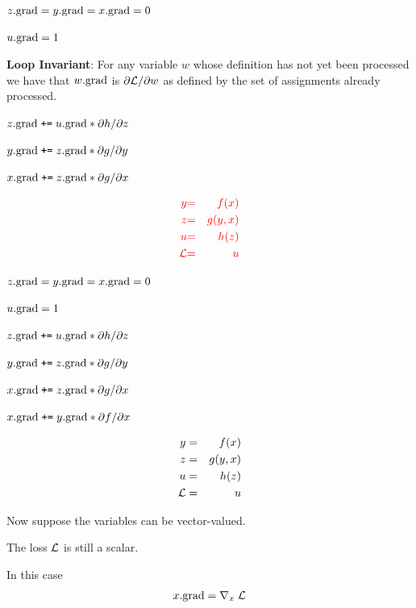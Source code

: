 {\medskip
$z.\mathrm{grad} = y.\mathrm{grad} = x.\mathrm{grad} = 0$

\medskip
$u.\mathrm{grad} = 1$

\medskip
    {\bf Loop Invariant}: For any variable $w$ whose definition has not yet been processed we have that $w.\mathrm{grad}$ is $\partial {\cal L}/\partial w$ as defined by the set of assignments already processed.

\medskip
$z.\mathrm{grad}\;\mbox{\tt +=}\; u.\mathrm{grad} * {\partial h}/{\partial z}$

\medskip
$y.\mathrm{grad} \;\mbox{\tt +=}\; z.\mathrm{grad} * {\partial g}/{\partial y}$

\medskip
$x.\mathrm{grad} \;\mbox{\tt +=}\; z.\mathrm{grad} * {\partial g}/{\partial x}$

\vspace{-3ex}
\begin{eqnarray*}
  {\color{red} y} & {\color{red} =} & {\color{red} f(x)} \\
  {\color{red} z} & {\color{red} =} & {\color{red} g(y,x)} \\
  {\color{red} u} & {\color{red} =} & {\color{red} h(z)} \\
  {\color{red} {\cal L}} & {\color{red} =} & {\color{red} u}
\end{eqnarray*}

\medskip
$z.\mathrm{grad} = y.\mathrm{grad} = x.\mathrm{grad} = 0$

\medskip
$u.\mathrm{grad} = 1$

\medskip
$z.\mathrm{grad}\;\mbox{\tt +=}\; u.\mathrm{grad} * {\partial h}/{\partial z}$

\medskip
$y.\mathrm{grad} \;\mbox{\tt +=}\; z.\mathrm{grad} * {\partial g}/{\partial y}$

\medskip
$x.\mathrm{grad} \;\mbox{\tt +=}\; z.\mathrm{grad} * {\partial g}/{\partial x}$

\medskip
$x.\mathrm{grad} \;\mbox{\tt +=}\; y.\mathrm{grad} * {\partial f}/{\partial x}$


\vspace{-3ex}
\begin{eqnarray*}
  y & = & f(x) \\
  z & = & g(y,x) \\
  u & = & h(z) \\
  {\cal L} & = & u
\end{eqnarray*}

\vfill
Now suppose the variables can be  vector-valued.

\vfill
The loss ${\cal L}$ is still a scalar.

\vfill
In this case
$$x.\mathrm{grad} = \nabla_x\;{\cal L}$$

}
